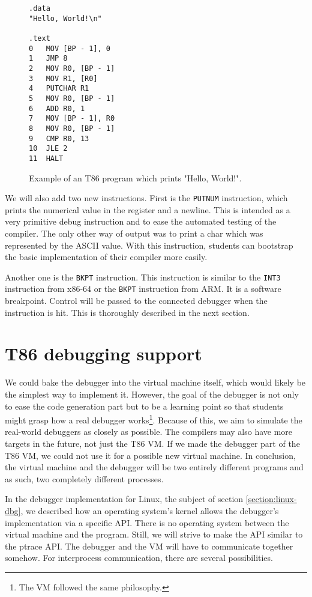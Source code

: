 \begin{figure}
    \begin{lstlisting}
.data
"Hello, World!\n"

.text
0   MOV [BP - 1], 0
1   JMP 8
2   MOV R0, [BP - 1]
3   MOV R1, [R0]
4   PUTCHAR R1
5   MOV R0, [BP - 1]
6   ADD R0, 1
7   MOV [BP - 1], R0
8   MOV R0, [BP - 1]
9   CMP R0, 13
10  JLE 2
11  HALT
    \end{lstlisting}
    \caption{Example of an T86 program which prints "Hello, World!".}
    \label{fig:t86-program}
\end{figure}
We will also add two new instructions. First is the \texttt{PUTNUM}
instruction, which prints the numerical value in the register and a newline.
This is intended as a very primitive debug instruction and to ease the
automated testing of the compiler. The only other way of output was to print a
char which was represented by the ASCII value. With this instruction, students
can bootstrap the basic implementation of their compiler more easily.

Another one is the \texttt{BKPT} instruction. This instruction is similar to
the \texttt{INT3} instruction from x86-64 or the \texttt{BKPT} instruction from
ARM. It is a software breakpoint. Control will be passed to the connected
debugger when the instruction is hit. This is thoroughly described in the next
section. 

\section{T86 debugging support}
We could bake the debugger into the virtual machine itself, which would likely
be the simplest way to implement it. However, the goal of the debugger is not
only to ease the code generation part but to be a learning point so that
students might grasp how a real debugger works\footnote{The VM followed the
same philosophy.}. Because of this, we aim to simulate the real-world debuggers
as closely as possible. The compilers may also have more targets in the future,
not just the T86 VM. If we made the debugger part of the T86 VM, we could not
use it for a possible new virtual machine. In conclusion, the virtual machine
and the debugger will be two entirely different programs and as such, two
completely different processes.

In the debugger implementation for Linux, the subject of section
\ref{section:linux-dbg}, we described how an operating system's kernel allows
the debugger's implementation via a specific API. There is no operating system
between the virtual machine and the program. Still, we will strive to make the
API similar to the ptrace API. The debugger and the VM will have to communicate
together somehow. For interprocess communication, there are several
possibilities.

